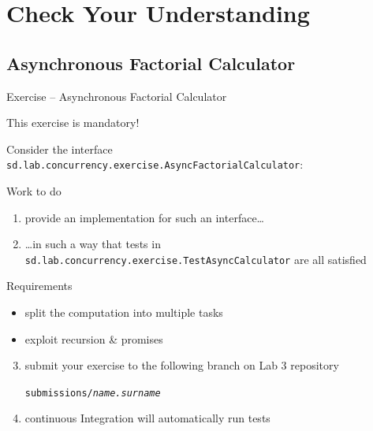\documentclass[presentation]{beamer}\mode<presentation>{\usetheme{AMSBolognaFC}}
\begin{document}
\section{Check Your Understanding}

\startExercise

\subsection{Asynchronous Factorial Calculator}

\begin{frame}[c,allowframebreaks]{Exercise \currentExercise{} -- Asynchronous Factorial Calculator}

    \begin{alertblock}{}
        \centering
        This exercise is \alert{mandatory}!
    \end{alertblock}

    \bigskip

	Consider the interface \texttt{sd.lab.concurrency.exercise.\alert{AsyncFactorialCalculator}}:
	
	\framebreak

    Work to do
	\begin{enumerate}
		\item provide an implementation for such an interface\ldots

		\item \ldots in such a way that tests in \texttt{sd.lab\allowbreak{}.concurrency\allowbreak{}.exercise\allowbreak{}.\alert{TestAsyncCalculator}} are all satisfied

	\end{enumerate}

    \bigskip

	\begin{block}{Requirements}
		\begin{itemize}
			\item split the computation into multiple tasks
			\item exploit recursion \& promises
		\end{itemize}
	\end{block}

	\bigskip

    \begin{enumerate}\setcounter{enumi}{2}

		\item submit your exercise to the following branch on Lab 3 repository
		\begin{center}
			\texttt{submissions/\textit{name.surname}}
		\end{center}

		\item continuous Integration will automatically run tests
	\end{enumerate}

\end{frame}
\end{document}
